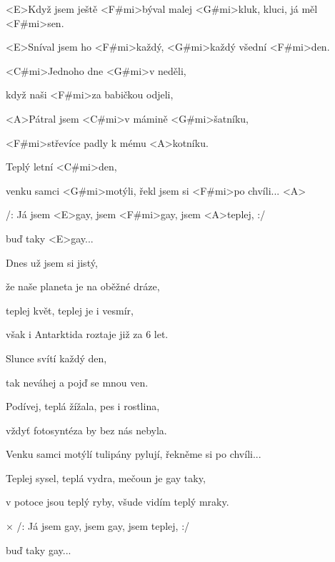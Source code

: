 

\zs
<E>Když jsem ještě <F#mi>býval malej <G#mi>kluk,
kluci, já měl <F#mi>sen.

<E>Sníval jsem ho <F#mi>každý, <G#mi>každý všední 
<F#mi>den.

<C#mi>Jednoho dne <G#mi>v neděli,

když naši <F#mi>za babičkou odjeli,

<A>Pátral jsem <C#mi>v mámině <G#mi>šatníku,

<F#mi>střevíce padly k mému <A>kotníku.

Teplý letní <C#mi>den,

venku samci <G#mi>motýli, řekl jsem si <F#mi>po chvíli... <A>
\ks

\zr
/: Já jsem <E>gay, jsem <F#mi>gay, jsem <A>teplej, :/

buď taky <E>gay...
\kr

\zs
Dnes už jsem si jistý,

že naše planeta je na oběžné dráze,

teplej květ, teplej je i vesmír,

však i Antarktida roztaje již za 6 let.

Slunce svítí každý den,

tak neváhej a pojď se mnou ven.

Podívej, teplá žížala, pes i rostlina,

vždyť fotosyntéza by bez nás nebyla.

Venku samci motýlí tulipány pylují, řekněme si po chvíli...
\ks

\zr \kr

\zs
Teplej sysel, teplá vydra, mečoun je gay taky,

v potoce jsou teplý ryby, všude vidím teplý mraky.
\ks

× /: Já jsem gay, jsem gay, jsem teplej, :/

buď taky gay...
\kr

\kp
